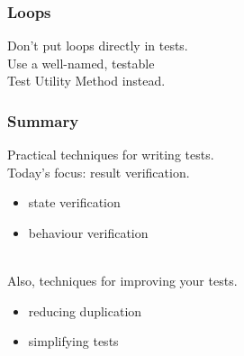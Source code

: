 \documentclass{beamer}
\newenvironment{changemargin}[1]{%
  \begin{list}{}{%
    \setlength{\topsep}{0pt}%
    \setlength{\leftmargin}{#1}%
    \setlength{\rightmargin}{1em}
    \setlength{\listparindent}{\parindent}%
    \setlength{\itemindent}{\parindent}%
    \setlength{\parsep}{\parskip}%
  }%
  \item[]}{\end{list}}
\begin{document}
\begin{frame}
  \frametitle{Loops}
  \Large
  \begin{changemargin}{2cm}
    Don't put loops directly in tests.\\[1em]
    Use a well-named, testable \\Test Utility Method instead.
  \end{changemargin}
\end{frame}

\begin{frame}
  \frametitle{Summary}
  \Large
  \begin{changemargin}{1cm}
    Practical techniques for writing tests.\\[1em]

    Today's focus: result verification.
    \begin{itemize}
    \item state verification
    \item behaviour verification
    \end{itemize}~\\

    Also, techniques for improving your tests.
    \begin{itemize}
    \item reducing duplication
    \item simplifying tests
    \end{itemize}

  \end{changemargin}
\end{frame}
\end{document}
